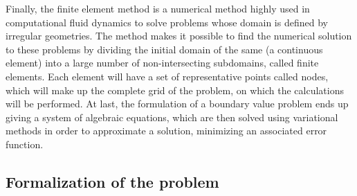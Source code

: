 \documentclass[12pt,letterpaper]{article}
\begin{document}
Finally, the finite element method is a numerical method highly used in computational fluid dynamics to solve problems whose domain is defined by irregular geometries. The method makes it possible to find the numerical solution to these problems by dividing the initial domain of the same (a continuous element) into a large number of non-intersecting subdomains, called finite elements. Each element will have a set of representative points called nodes, which will make up the complete grid of the problem, on which the calculations will be performed. At last, the formulation of a boundary value problem ends up giving a system of algebraic equations, which are then solved using variational methods in order to approximate a solution, minimizing an associated error function\cite{element}.\\



\subsection{Formalization of the problem}

\end{document}
